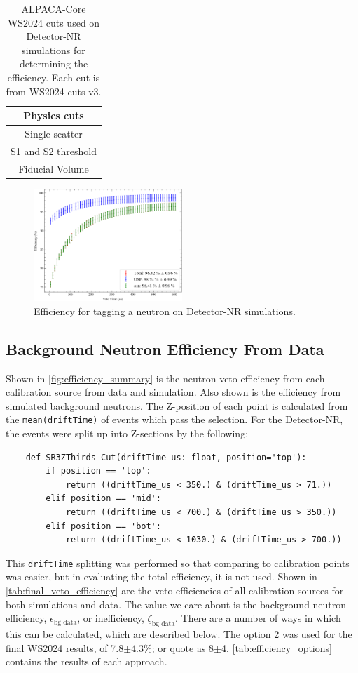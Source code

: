 \begin{table}
	\centering
	\begin{tabular}{c}
		Physics cuts        \\
		\hline
		Single scatter      \\
		S1 and S2 threshold \\
		Fiducial Volume
	\end{tabular}
	\caption{ALPACA-Core WS2024 cuts used on Detector-NR simulations for determining the efficiency. Each cut is from WS2024-cuts-v3.}
	\label{tab:detector_nr_simulation_efficiency_cuts}
\end{table}

\begin{figure}
	\centering
	\includegraphics[width=0.5\textwidth]{figures/VetoEfficiency/det_nr_efficiency.png}
	\caption{Efficiency for tagging a neutron on Detector-NR simulations.}
	\label{fig:detector_nr_efficiency}
\end{figure}

\clearpage
\subsection{Background Neutron Efficiency From Data}
Shown in \autoref{fig:efficiency_summary} is the neutron veto efficiency from each calibration source from data and simulation.
Also shown is the efficiency from simulated background neutrons.
The Z-position of each point is calculated from the \lstinline{mean(driftTime)} of events which pass the selection.
For the Detector-NR, the events were split up into Z-sections by the following;
\begin{lstlisting}
    def SR3ZThirds_Cut(driftTime_us: float, position='top'):
        if position == 'top':
            return ((driftTime_us < 350.) & (driftTime_us > 71.))
        elif position == 'mid':
            return ((driftTime_us < 700.) & (driftTime_us > 350.))
        elif position == 'bot':
            return ((driftTime_us < 1030.) & (driftTime_us > 700.))
\end{lstlisting}
This \lstinline{driftTime} splitting was performed so that comparing to calibration points was easier, but in evaluating the total efficiency, it is not used.
Shown in \autoref{tab:final_veto_efficiency} are the veto efficiencies of all calibration sources for both simulations and data.
The value we care about is the background neutron efficiency, $\epsilon_{\textrm{bg data}}$, or inefficiency, $\zeta_{\textrm{bg data}}$.
There are a number of ways in which this can be calculated, which are described below.
The option 2 was used for the final WS2024 results, of 7.8$\pm$4.3\%; or quote as 8$\pm$4.
\autoref{tab:efficiency_options} contains the results of each approach.
